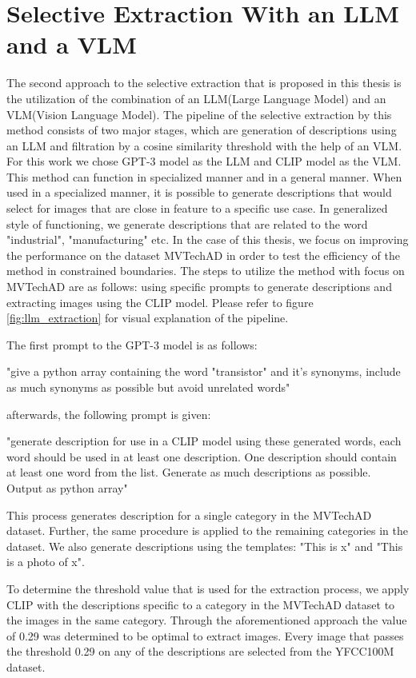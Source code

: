 \section{Selective Extraction With an LLM and a VLM}
\label{sec:llm_and_vlm_extraction}
The second approach to the selective extraction that is proposed in this thesis is the utilization of the combination of an LLM(Large Language Model) and an VLM(Vision Language Model). The pipeline of the selective extraction by this method consists of two major stages, which are generation of descriptions using an LLM and filtration by a cosine similarity threshold with the help of an VLM. For this work we chose GPT-3 model as the LLM and CLIP model as the VLM. This method can function in specialized manner and in a general manner. When used in a specialized manner, it is possible to generate descriptions that would select for images that are close in feature to a specific use case. In generalized style of functioning, we generate descriptions that are related to the word "industrial", "manufacturing" etc. In the case of this thesis, we focus on improving the performance on the dataset MVTechAD in order to test the efficiency of the method in constrained boundaries. The steps to utilize the method with focus on MVTechAD are as follows: using specific prompts to generate descriptions and extracting images using the CLIP model. Please refer to figure \ref{fig:llm_extraction} for visual explanation of the pipeline.

The first prompt to the GPT-3 model is as follows:

"give a python array containing the word "transistor" and it's synonyms, include as much synonyms as possible but avoid unrelated words"

afterwards, the following prompt is given:

"generate description for use in a CLIP model using these generated words, each word should be used in at least one description. One description should contain at least one word from the list. Generate as much descriptions as possible. Output as python array"

This process generates description for a single category in the MVTechAD dataset. Further, the same procedure is applied to the remaining categories in the dataset. We also generate descriptions using the templates: "This is x" and "This is a photo of x".

To determine the threshold value that is used for the extraction process, we apply CLIP with the descriptions specific to a category in the MVTechAD dataset to the images in the same category. Through the aforementioned approach the value of 0.29 was determined to be optimal to extract images. Every image that passes the threshold 0.29 on any of the descriptions are selected from the YFCC100M dataset. 

